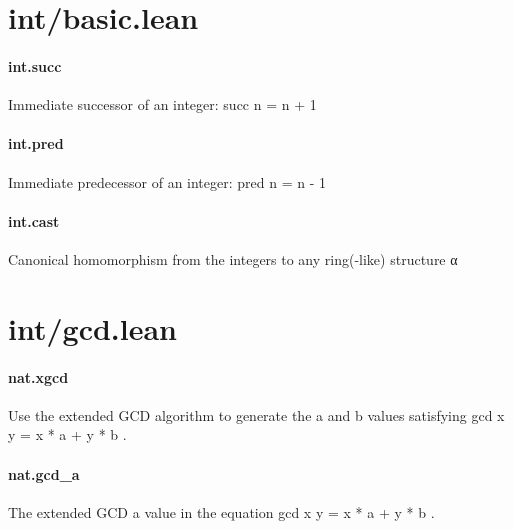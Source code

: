 \documentclass{article}
\begin{document}
\section{int/basic.lean}\paragraph{int.succ}
\par
Immediate successor of an integer: 
\colorbox[RGB]{253,246,227}{{{{\color[RGB]{101, 123, 131} succ n  }}}{{{\color[RGB]{181, 137, 0} = }}}{{{\color[RGB]{101, 123, 131}  n  }}}{{{\color[RGB]{181, 137, 0} + }}}{{{\color[RGB]{101, 123, 131}   }}}{{{\color[RGB]{108, 113, 196} 1 }}}}\paragraph{int.pred}
\par
Immediate predecessor of an integer: 
\colorbox[RGB]{253,246,227}{{{{\color[RGB]{101, 123, 131} pred n  }}}{{{\color[RGB]{181, 137, 0} = }}}{{{\color[RGB]{101, 123, 131}  n  }}}{{{\color[RGB]{181, 137, 0} - }}}{{{\color[RGB]{101, 123, 131}   }}}{{{\color[RGB]{108, 113, 196} 1 }}}}\paragraph{int.cast}
\par
Canonical homomorphism from the integers to any ring(-like) structure 
\colorbox[RGB]{253,246,227}{{{{\color[RGB]{101, 123, 131} α }}}}\section{int/gcd.lean}\paragraph{nat.xgcd}
\par
Use the extended GCD algorithm to generate the 
\colorbox[RGB]{253,246,227}{{{{\color[RGB]{101, 123, 131} a }}}} and 
\colorbox[RGB]{253,246,227}{{{{\color[RGB]{101, 123, 131} b }}}} values
satisfying 
\colorbox[RGB]{253,246,227}{{{{\color[RGB]{101, 123, 131} gcd x y  }}}{{{\color[RGB]{181, 137, 0} = }}}{{{\color[RGB]{101, 123, 131}  x  }}}{{{\color[RGB]{181, 137, 0} * }}}{{{\color[RGB]{101, 123, 131}  a  }}}{{{\color[RGB]{181, 137, 0} + }}}{{{\color[RGB]{101, 123, 131}  y  }}}{{{\color[RGB]{181, 137, 0} * }}}{{{\color[RGB]{101, 123, 131}  b }}}}.
\paragraph{nat.gcd\_a}
\par
The extended GCD 
\colorbox[RGB]{253,246,227}{{{{\color[RGB]{101, 123, 131} a }}}} value in the equation 
\colorbox[RGB]{253,246,227}{{{{\color[RGB]{101, 123, 131} gcd x y  }}}{{{\color[RGB]{181, 137, 0} = }}}{{{\color[RGB]{101, 123, 131}  x  }}}{{{\color[RGB]{181, 137, 0} * }}}{{{\color[RGB]{101, 123, 131}  a  }}}{{{\color[RGB]{181, 137, 0} + }}}{{{\color[RGB]{101, 123, 131}  y  }}}{{{\color[RGB]{181, 137, 0} * }}}{{{\color[RGB]{101, 123, 131}  b }}}}.
\end{document}
